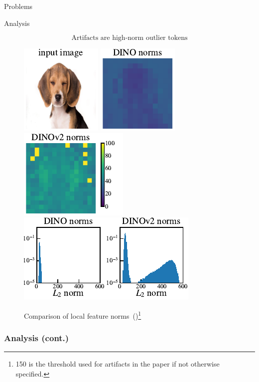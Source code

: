 \documentclass[aspectratio=169]{beamer}
\begin{document}
\begin{section}{Problems}
\begin{subsection}{Analysis}
\begin{frame}
$$\boxed{\text{Artifacts are high-norm outlier tokens}}$$

\vspace{2em}
\begin{figure}[t]
    \includegraphics{resources/figure_3_1.pdf} 
    \includegraphics{resources/figure_3_2.pdf} 
    \includegraphics{resources/figure_3_3.pdf} 
    \includegraphics{resources/figure_3_4.pdf} 
    \caption{
      Comparison of local feature norms~(\cite{darcetVisionTransformersNeed2024})\footnote{150 is the threshold used for artifacts in the paper if not otherwise specified.}
    }  
    \label{fig:norms_hist}
\end{figure}
\end{frame}

\begin{frame}
\frametitle{Analysis (cont.)}
\vspace{1em}


\end{frame}
\end{subsection}
\end{section}
\end{document}
